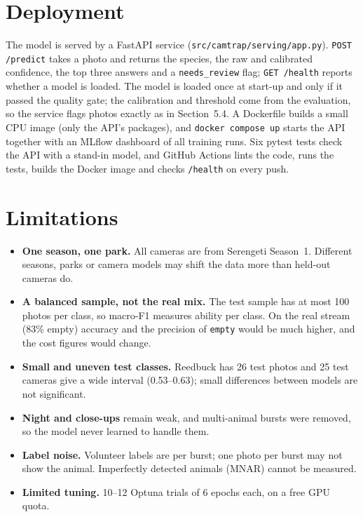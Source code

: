 \documentclass[11pt,a4paper]{article}
\begin{document}
\section{Deployment}
The model is served by a FastAPI service (\texttt{src/camtrap/serving/app.py}). \texttt{POST /predict}
takes a photo and returns the species, the raw and calibrated confidence, the top three answers and a
\texttt{needs\_review} flag; \texttt{GET /health} reports whether a model is loaded. The model is loaded
once at start-up and only if it passed the quality gate; the calibration and threshold come from the
evaluation, so the service flags photos exactly as in Section~5.4. A Dockerfile builds a small CPU image
(only the API's packages), and \texttt{docker compose up} starts the API together with an MLflow dashboard
of all training runs. Six pytest tests check the API with a stand-in model, and GitHub Actions lints the
code, runs the tests, builds the Docker image and checks \texttt{/health} on every push.

\section{Limitations}
\begin{itemize}
\item \textbf{One season, one park.} All cameras are from Serengeti Season~1. Different seasons, parks or
      camera models may shift the data more than held-out cameras do.
\item \textbf{A balanced sample, not the real mix.} The test sample has at most 100 photos per class, so
      macro-F1 measures ability per class. On the real stream (83\% empty) accuracy and the precision of
      \texttt{empty} would be much higher, and the cost figures would change.
\item \textbf{Small and uneven test classes.} Reedbuck has 26 test photos and 25 test cameras give a wide
      interval (0.53--0.63); small differences between models are not significant.
\item \textbf{Night and close-ups} remain weak, and multi-animal bursts were removed, so the model never
      learned to handle them.
\item \textbf{Label noise.} Volunteer labels are per burst; one photo per burst may not show the animal.
      Imperfectly detected animals (MNAR) cannot be measured.
\item \textbf{Limited tuning.} 10--12 Optuna trials of 6 epochs each, on a free GPU quota.
\end{itemize}
\end{document}
